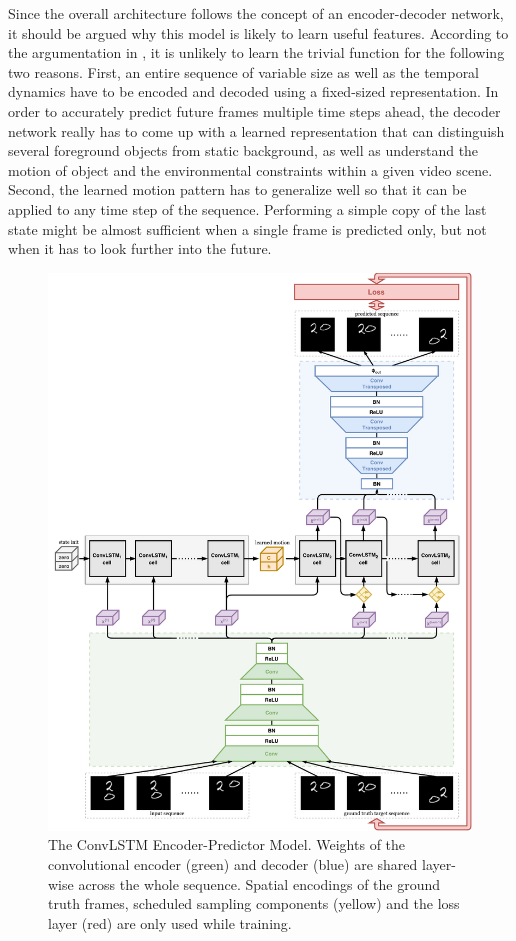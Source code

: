 Since the overall architecture follows the concept of an encoder-decoder network, it should be argued why this model is likely to learn useful features. According to the argumentation in \parencite[p. 3f.]{unsup_learn_lstm}, it is unlikely to learn the trivial function for the following two reasons. First, an entire sequence of variable size as well as the temporal dynamics have to be encoded and decoded using a fixed-sized representation. In order to accurately predict future frames multiple time steps ahead, the decoder network really has to come up with a learned representation that can distinguish several foreground objects from static background, as well as understand the motion of object and the environmental constraints within a given video scene. Second, the learned motion pattern has to generalize well so that it can be applied to any time step of the sequence. Performing a simple copy of the last state might be almost sufficient when a single frame is predicted only, but not when it has to look further into the future.

\begin{figure}[p]
	\centering
	\includegraphics[width=0.96\linewidth]{figures/total_model.pdf}
	\caption[ConvLSTM Encoder-Predictor Model]{The ConvLSTM Encoder-Predictor Model. Weights of the convolutional encoder (green) and decoder (blue) are shared layer-wise across the whole sequence. Spatial encodings of the ground truth frames, scheduled sampling components (yellow) and the loss layer (red) are only used while training.} \label{fig:total_model}
\end{figure}

